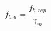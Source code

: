 \documentclass[12pt]{article}
\begin{document}
\begin{displaymath}
f_{b;d} = \frac {f_{b;rep}} {\gamma_m}
\end{displaymath}
\end{document}
